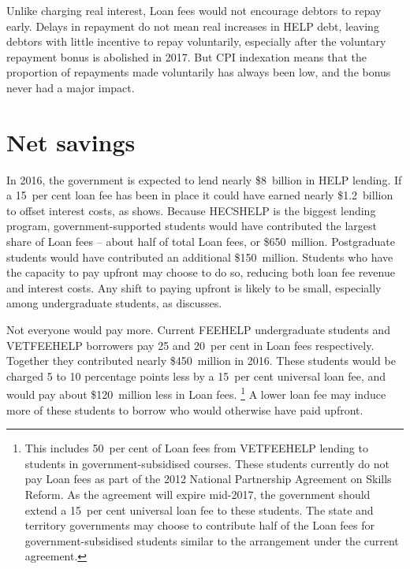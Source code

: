 \documentclass{grattan}
\begin{document}
Unlike charging real interest, \gls{Loan fees} would not encourage debtors to repay early.
Delays in repayment do not mean real increases in \gls{HELP} debt, leaving debtors with little incentive to repay voluntarily, especially after the voluntary repayment bonus is abolished in 2017.
But \gls{CPI} indexation means that the proportion of repayments made voluntarily has always been low, and the bonus never had a major impact.

\section{Net savings}\label{net-savings}


In 2016, the government is expected to lend nearly \$8~billion in \gls{HELP} lending.
If a 15~per cent loan fee has been in place it could have earned nearly \$1.2~billion to offset interest costs, as  shows.
Because \gls{HECSHELP} is the biggest lending program, government-supported students would have contributed the largest share of \gls{Loan fees} -- about half of total \gls{Loan fees}, or \$650~million.
Postgraduate students would have contributed an additional \$150~million.
Students who have the capacity to pay upfront may choose to do so, reducing both loan fee revenue and interest costs.
Any shift to paying upfront is likely to be small, especially among undergraduate students, as  discusses.

Not everyone would pay more.
Current \gls{FEEHELP} undergraduate students and \gls{VETFEEHELP} borrowers pay 25 and 20~per cent in \gls{Loan fees} respectively.
Together they contributed nearly \$450~million in 2016.
These students would be charged 5 to 10 percentage points less by a 15~per cent universal loan fee, and would pay about \$120~million less in \gls{Loan fees}.%
   \footnote{This includes 50~per cent of \gls{Loan fees} from \gls{VETFEEHELP} lending to students in government-subsidised courses.
These students currently do not pay \gls{Loan fees} as part of the 2012 National Partnership Agreement on Skills Reform.
As the agreement will expire mid-2017, the government should extend a 15~per cent universal loan fee to these students.
The state and territory governments may choose to contribute half of the \gls{Loan fees} for government-subsidised students similar to the arrangement under the current agreement.} A lower loan fee may induce more of these students to borrow who would otherwise have paid upfront.
\end{document}

